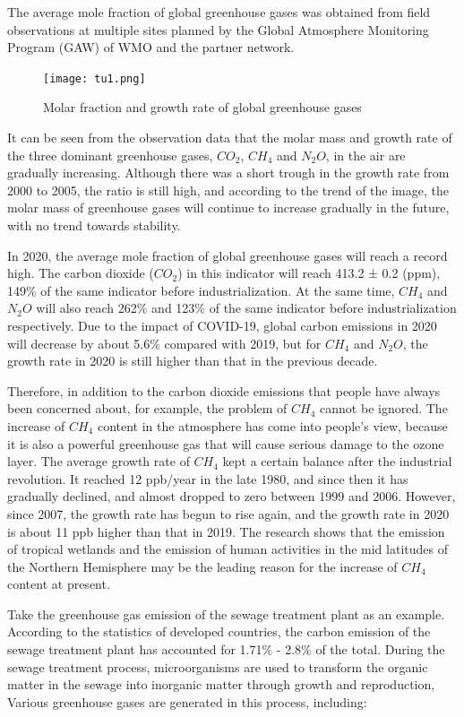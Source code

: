 \documentclass{apmcmthesis}
\begin{document}
The average mole fraction of global greenhouse gases was obtained from field observations at multiple sites planned by the Global Atmosphere Monitoring Program (GAW) of WMO and the partner network.\cite{101}

 \begin{figure} 
    \centering
    \texttt{[image: tu1.png]}
    \caption{Molar fraction and growth rate of global greenhouse gases}
\label{growth}
\end{figure}

It can be seen from the observation data that the molar mass and growth rate of the three dominant greenhouse gases, $CO_2$, $CH_4$ and $N_2O$, in the air are gradually increasing. Although there was a short trough in the growth rate from 2000 to 2005, the ratio is still high, and according to the trend of the image, the molar mass of greenhouse gases will continue to increase gradually in the future, with no trend towards stability.

In 2020, the average mole fraction of global greenhouse gases will reach a record high. The carbon dioxide ($CO_2$) in this indicator will reach 413.2 ± 0.2 (ppm), 149$\%$ of the same indicator before industrialization. At the same time, $CH_4$ and $N_2O$ will also reach 262$\%$ and 123$\%$ of the same indicator before industrialization respectively. Due to the impact of COVID-19, global carbon emissions in 2020 will decrease by about 5.6$\%$ compared with 2019\cite{102}, but for $CH_4$ and $N_2O$, the growth rate in 2020 is still higher than that in the previous decade.

Therefore, in addition to the carbon dioxide emissions that people have always been concerned about, for example, the problem of $CH_4$ cannot be ignored. The increase of $CH_4$ content in the atmosphere has come into people's view, because it is also a powerful greenhouse gas that will cause serious damage to the ozone layer. The average growth rate of $CH_4$ kept a certain balance after the industrial revolution. It reached 12 ppb/year in the late 1980, and since then it has gradually declined, and almost dropped to zero between 1999 and 2006. However, since 2007, the growth rate has begun to rise again, and the growth rate in 2020 is about 11 ppb higher than that in 2019. The research shows that the emission of tropical wetlands and the emission of human activities in the mid latitudes of the Northern Hemisphere may be the leading reason for the increase of $CH_4$ content at present\cite{103}.

Take the greenhouse gas emission of the sewage treatment plant as an example. According to the statistics of developed countries, the carbon emission of the sewage treatment plant has accounted for 1.71$\%$ - 2.8$\%$ of the total\cite{104}. During the sewage treatment process, microorganisms are used to transform the organic matter in the sewage into inorganic matter through growth and reproduction, Various greenhouse gases are generated in this process, including:
\end{document}

